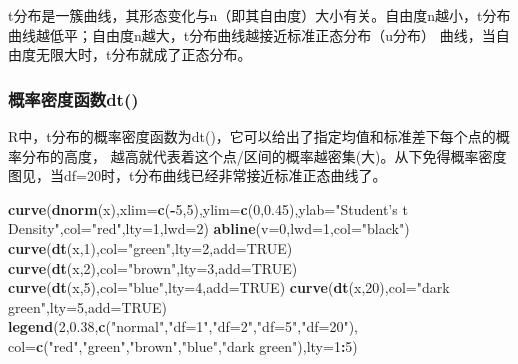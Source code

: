 \documentclass[
]{article}
\newenvironment{Shaded}{\begin{snugshade}}{\end{snugshade}}
\newcommand{\DataTypeTok}[1]{\textcolor[rgb]{0.13,0.29,0.53}{#1}}
\newcommand{\DecValTok}[1]{\textcolor[rgb]{0.00,0.00,0.81}{#1}}
\newcommand{\FloatTok}[1]{\textcolor[rgb]{0.00,0.00,0.81}{#1}}
\newcommand{\KeywordTok}[1]{\textcolor[rgb]{0.13,0.29,0.53}{\textbf{#1}}}
\newcommand{\NormalTok}[1]{#1}
\newcommand{\OperatorTok}[1]{\textcolor[rgb]{0.81,0.36,0.00}{\textbf{#1}}}
\newcommand{\OtherTok}[1]{\textcolor[rgb]{0.56,0.35,0.01}{#1}}
\newcommand{\StringTok}[1]{\textcolor[rgb]{0.31,0.60,0.02}{#1}}
\begin{document}
t分布是一簇曲线，其形态变化与n（即其自由度）大小有关。自由度n越小，t分布曲线越低平；自由度n越大，t分布曲线越接近标准正态分布（u分布）
曲线，当自由度无限大时，t分布就成了正态分布。

\hypertarget{ux6982ux7387ux5bc6ux5ea6ux51fdux6570dt}{%
\subsubsection{概率密度函数dt()}\label{ux6982ux7387ux5bc6ux5ea6ux51fdux6570dt}}

R中，t分布的概率密度函数为dt()，它可以给出了指定均值和标准差下每个点的概率分布的高度，
越高就代表着这个点/区间的概率越密集(大)。从下免得概率密度图见，当df=20时，t分布曲线已经非常接近标准正态曲线了。

\begin{Shaded}
\begin{Highlighting}[]
\KeywordTok{curve}\NormalTok{(}\KeywordTok{dnorm}\NormalTok{(x),}\DataTypeTok{xlim=}\KeywordTok{c}\NormalTok{(}\OperatorTok{-}\DecValTok{5}\NormalTok{,}\DecValTok{5}\NormalTok{),}\DataTypeTok{ylim=}\KeywordTok{c}\NormalTok{(}\DecValTok{0}\NormalTok{,}\FloatTok{0.45}\NormalTok{),}\DataTypeTok{ylab=}\StringTok{"Student's t Density"}\NormalTok{,}\DataTypeTok{col=}\StringTok{"red"}\NormalTok{,}\DataTypeTok{lty=}\DecValTok{1}\NormalTok{,}\DataTypeTok{lwd=}\DecValTok{2}\NormalTok{)}
\KeywordTok{abline}\NormalTok{(}\DataTypeTok{v=}\DecValTok{0}\NormalTok{,}\DataTypeTok{lwd=}\DecValTok{1}\NormalTok{,}\DataTypeTok{col=}\StringTok{"black"}\NormalTok{)}
\KeywordTok{curve}\NormalTok{(}\KeywordTok{dt}\NormalTok{(x,}\DecValTok{1}\NormalTok{),}\DataTypeTok{col=}\StringTok{"green"}\NormalTok{,}\DataTypeTok{lty=}\DecValTok{2}\NormalTok{,}\DataTypeTok{add=}\OtherTok{TRUE}\NormalTok{)}
\KeywordTok{curve}\NormalTok{(}\KeywordTok{dt}\NormalTok{(x,}\DecValTok{2}\NormalTok{),}\DataTypeTok{col=}\StringTok{"brown"}\NormalTok{,}\DataTypeTok{lty=}\DecValTok{3}\NormalTok{,}\DataTypeTok{add=}\OtherTok{TRUE}\NormalTok{)}
\KeywordTok{curve}\NormalTok{(}\KeywordTok{dt}\NormalTok{(x,}\DecValTok{5}\NormalTok{),}\DataTypeTok{col=}\StringTok{"blue"}\NormalTok{,}\DataTypeTok{lty=}\DecValTok{4}\NormalTok{,}\DataTypeTok{add=}\OtherTok{TRUE}\NormalTok{)}
\KeywordTok{curve}\NormalTok{(}\KeywordTok{dt}\NormalTok{(x,}\DecValTok{20}\NormalTok{),}\DataTypeTok{col=}\StringTok{"dark green"}\NormalTok{,}\DataTypeTok{lty=}\DecValTok{5}\NormalTok{,}\DataTypeTok{add=}\OtherTok{TRUE}\NormalTok{)}
\KeywordTok{legend}\NormalTok{(}\DecValTok{2}\NormalTok{,}\FloatTok{0.38}\NormalTok{,}\KeywordTok{c}\NormalTok{(}\StringTok{"normal"}\NormalTok{,}\StringTok{"df=1"}\NormalTok{,}\StringTok{"df=2"}\NormalTok{,}\StringTok{"df=5"}\NormalTok{,}\StringTok{"df=20"}\NormalTok{),}
       \DataTypeTok{col=}\KeywordTok{c}\NormalTok{(}\StringTok{"red"}\NormalTok{,}\StringTok{"green"}\NormalTok{,}\StringTok{"brown"}\NormalTok{,}\StringTok{"blue"}\NormalTok{,}\StringTok{"dark green"}\NormalTok{),}\DataTypeTok{lty=}\DecValTok{1}\OperatorTok{:}\DecValTok{5}\NormalTok{)}
\end{Highlighting}
\end{Shaded}
\end{document}
